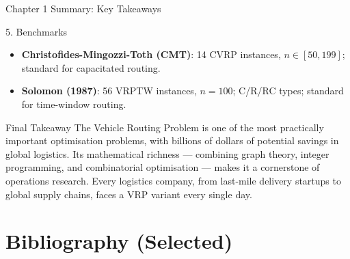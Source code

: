 \documentclass[aspectratio=169,10pt]{beamer}
\begin{document}
\begin{frame}[allowframebreaks]{Chapter 1 Summary: Key Takeaways}
\begin{block}{5. Benchmarks}
\begin{itemize}
  \item \textbf{Christofides-Mingozzi-Toth (CMT)}: 14 CVRP instances,
        $n \in [50, 199]$; standard for capacitated routing.
  \item \textbf{Solomon (1987)}: 56 VRPTW instances, $n=100$; C/R/RC types;
        standard for time-window routing.
\end{itemize}
\end{block}

\begin{alertblock}{Final Takeaway}
The Vehicle Routing Problem is one of the most practically important optimisation
problems, with billions of dollars of potential savings in global logistics.  Its
mathematical richness --- combining graph theory, integer programming, and
combinatorial optimisation --- makes it a cornerstone of operations research.
Every logistics company, from last-mile delivery startups to global supply chains,
faces a VRP variant every single day.
\end{alertblock}

\end{frame}

\section{Bibliography (Selected)}
\end{document}
